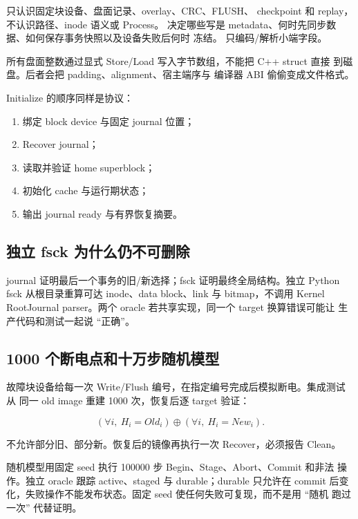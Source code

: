  只认识固定块设备、盘面记录、overlay、CRC、FLUSH、
checkpoint 和 replay，不认识路径、inode 语义或 Process。
决定哪些写是 metadata、何时先同步数据、如何保存事务快照以及设备失败后何时
冻结。 只编码/解析小端字段。

所有盘面整数通过显式 Store/Load 写入字节数组，不能把 C++ struct 直接
 到磁盘。后者会把 padding、alignment、宿主端序与
编译器 ABI 偷偷变成文件格式。

Initialize 的顺序同样是协议：

\begin{enumerate}
  \item 绑定 block device 与固定 journal 位置；
  \item Recover journal；
  \item 读取并验证 home superblock；
  \item 初始化 cache 与运行期状态；
  \item 输出 journal ready 与有界恢复摘要。
\end{enumerate}

\subsection{独立 fsck 为什么仍不可删除}

journal 证明最后一个事务的旧/新选择；fsck 证明最终全局结构。独立 Python
fsck 从根目录重算可达 inode、data block、link 与 bitmap，不调用 Kernel
RootJournal parser。两个 oracle 若共享实现，同一个 target 换算错误可能让
生产代码和测试一起说 ``正确''。

\subsection{1000 个断电点和十万步随机模型}

故障块设备给每一次 Write/Flush 编号，在指定编号完成后模拟断电。集成测试从
同一 old image 重建 1000 次，恢复后逐 target 验证：

\[
(\forall i,\ H_i=Old_i)
\oplus
(\forall i,\ H_i=New_i).
\]

不允许部分旧、部分新。恢复后的镜像再执行一次 Recover，必须报告 Clean。

随机模型用固定 seed 执行 100000 步 Begin、Stage、Abort、Commit 和非法
操作。独立 oracle 跟踪 active、staged 与 durable；durable 只允许在 commit
后变化，失败操作不能发布状态。固定 seed 使任何失败可复现，而不是用 ``随机
跑过一次'' 代替证明。

